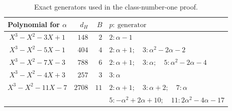 \begin{table}[htbp]
\centering
\small
\begin{tabular}{c|r|r|l}
 Polynomial for $\alpha$ & $d_H$ & $B$ & $p:\ \text{generator}$\\\hline
 $X^3-X^2-3X+1$ & $148$ & $2$ & $2:\alpha-1$\\
 $X^3-X^2-5X-1$ & $404$ & $4$ &
       $2:\alpha+1;\quad3:\alpha^2-2\alpha-2$\\
 $X^3-X^2-7X-3$ & $788$ & $6$ &
       $2:\alpha+1;\quad3:\alpha;\quad5:\alpha^2-2\alpha-4$\\
 $X^3-X^2-4X+3$ & $257$ & $3$ & $3:\alpha$\\
 $X^3-X^2-11X-7$ & $2708$ & $11$ &
       $2:\alpha+1;\quad3:\alpha+2;\quad7:\alpha$\\
 & & & $5:-\alpha^2+2\alpha+10;\quad11:2\alpha^2-4\alpha-17$
\end{tabular}
\caption{Exact generators used in the class-number-one proof.}
\label{corr:classnumber-table}
\end{table}

